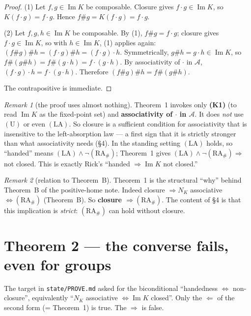 \documentclass[11pt]{article}
\theoremstyle{plain}
\theoremstyle{definition}
\theoremstyle{remark}
\newtheorem{remark}{Remark}[section]
\newcommand{\Acat}{\mathcal{A}}
\renewcommand{\Im}{\operatorname{Im}}
\newcommand{\NK}{N_K}
\begin{document}
\begin{proof}
(1) Let $f, g \in \Im K$ be composable. Closure gives $f\cdot g \in \Im K$, so $K(f\cdot g) =
f\cdot g$. Hence $f \# g = K(f\cdot g) = f\cdot g$.

(2) Let $f, g, h \in \Im K$ be composable. By (1), $f\#g = f\cdot g$; closure gives $f\cdot g \in
\Im K$, so with $h \in \Im K$, (1) applies again: $(f\#g)\#h = (f\cdot g)\#h = (f\cdot g)\cdot h$.
Symmetrically, $g\#h = g\cdot h \in \Im K$, so $f\#(g\#h) = f\#(g\cdot h) = f\cdot(g\cdot h)$. By
associativity of $\cdot$ in $\Acat$, $(f\cdot g)\cdot h = f\cdot(g\cdot h)$. Therefore
$(f\#g)\#h = f\#(g\#h)$.

The contrapositive is immediate.
\end{proof}

\begin{remark}[the proof uses almost nothing]
Theorem~1 invokes only \textbf{(K1)} (to read $\Im K$ as the fixed-point set) and
\textbf{associativity of $\cdot$ in $\Acat$}. It does \emph{not} use $(\mathrm{U})$ or even
$(\mathrm{LA})$. So closure is a sufficient condition for associativity that is insensitive to the
left-absorption law --- a first sign that it is strictly stronger than what associativity needs
(\S4). In the standing setting $(\mathrm{LA})$ holds, so ``handed'' means $(\mathrm{LA}) \wedge
\neg(\mathrm{RA}_\#)$; Theorem~1 gives $(\mathrm{LA}) \wedge \neg(\mathrm{RA}_\#) \Rightarrow$ not
closed. This is exactly Rick's ``handed $\Rightarrow \Im K$ not closed.''
\end{remark}

\begin{remark}[relation to Theorem~B]
Theorem~1 is the structural ``why'' behind Theorem~B of the positive-home note. Indeed closure
$\Rightarrow \NK$ associative $\iff (\mathrm{RA}_\#)$ (Theorem~B). So \textbf{closure $\Rightarrow
(\mathrm{RA}_\#)$}. The content of \S4 is that this implication is \emph{strict}:
$(\mathrm{RA}_\#)$ can hold without closure.
\end{remark}

\section{Theorem 2 --- the converse fails, even for groups}
\label{sec:thm2}

The target in \texttt{state/PROVE.md} asked for the biconditional ``handedness $\iff$
non-closure'', equivalently ``$\NK$ associative $\iff \Im K$ closed''. Only the $\Leftarrow$ of the
second form (= Theorem~1) is true. The $\Rightarrow$ is false.
\end{document}
